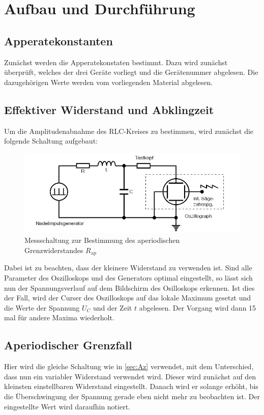 \section{Aufbau und Durchführung}
\subsection{Apperatekonstanten}
Zunächst werden die Apperatekonstaten bestimmt.
Dazu wird zunächst überprüft, welches der drei Geräte vorliegt und die Gerätenummer abgelesen.
Die dazugehörigen Werte werden vom vorliegenden Material abgelesen.
\subsection{Effektiver Widerstand und Abklingzeit \label{sec:Az}}
Um die Amplitudenabnahme des RLC-Kreises zu bestimmen, wird zunächst die folgende Schaltung aufgebaut:
\begin{figure}[H]
  \centering
  \includegraphics[width=\textwidth]{Text/Nadelimpulsgenerator.jpg}
  \caption{Messschaltung zur Bestimmung des aperiodischen Grenzwiderstandes $R_\text{ap}$ \cite[294]{sample}}
  \label{fig:Aufbau}
\end{figure}
Dabei ist zu beachten, dass der kleinere Widerstand zu verwenden ist.
Sind alle Parameter des Oszilloskops und des Generators optimal eingestellt, so lässt sich nun der Spannungsverlauf
auf dem Bildschirm des Osilloskops erkennen.
Ist dies der Fall, wird der Curser des Oszilloskops auf das lokale Maximum gesetzt
und die Werte der Spannung $U_C$ und der Zeit $t$ abgelesen.
Der Vorgang wird dann 15 mal für andere Maxima wiederholt.
\subsection{Aperiodischer Grenzfall}
Hier wird die gleiche Schaltung wie in \ref{sec:Az} verwendet, mit dem Unterschied, dass
nun ein variabler Widerstand verwendet wird. Dieser wird zunächst auf den kleinsten einstellbaren Widerstand eingestellt.
Danach wird er solange erhöht, bis die Überschwingung der Spannung gerade eben nicht mehr zu beobachten ist.
Der eingestellte Wert wird daraufhin notiert.
\newpage
